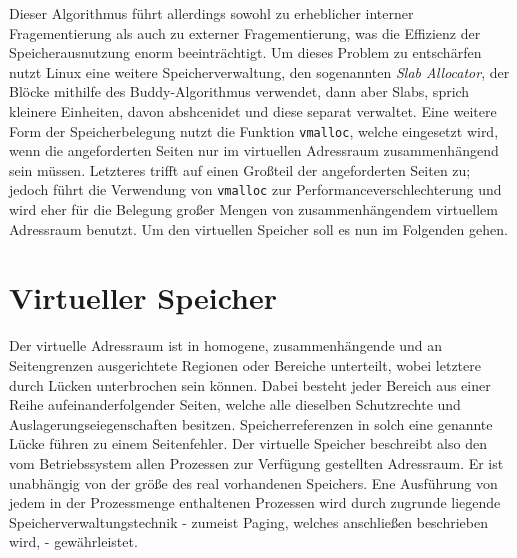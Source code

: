 \documentclass[11pt,a4paper]{article}
\begin{document}
\newline
Dieser Algorithmus führt allerdings sowohl zu erheblicher interner Fragementierung als auch zu externer Fragementierung, was die Effizienz der Speicherausnutzung enorm beeinträchtigt.
\newline
Um dieses Problem zu entschärfen nutzt Linux eine weitere Speicherverwaltung, den sogenannten \textit{Slab Allocator}, der Blöcke mithilfe des Buddy-Algorithmus verwendet, dann aber Slabs, sprich kleinere Einheiten, davon abshcenidet und diese separat verwaltet. 
\newline
Eine weitere Form der Speicherbelegung nutzt die Funktion \texttt{vmalloc}, welche eingesetzt wird, wenn die angeforderten Seiten nur im virtuellen Adressraum zusammenhängend sein müssen. Letzteres trifft auf einen Großteil der 
angeforderten Seiten zu; jedoch führt die Verwendung von \texttt{vmalloc} zur Performanceverschlechterung und wird eher für die Belegung großer Mengen von zusammenhängendem virtuellem Adressraum benutzt. Um den virtuellen Speicher soll es nun im Folgenden gehen.

\newpage 
\section*{Virtueller Speicher}
Der virtuelle Adressraum ist in homogene, zusammenhängende und an Seitengrenzen ausgerichtete Regionen oder Bereiche unterteilt, wobei letztere durch Lücken unterbrochen sein können. Dabei besteht jeder Bereich aus einer Reihe aufeinanderfolgender Seiten, welche alle dieselben Schutzrechte und Auslagerungseiegenschaften besitzen. Speicherreferenzen in solch eine genannte Lücke führen zu einem Seitenfehler. Der virtuelle Speicher beschreibt also den vom Betriebssystem allen Prozessen zur Verfügung gestellten Adressraum. Er ist unabhängig von der größe des real vorhandenen Speichers. Ene Ausführung von jedem in der Prozessmenge enthaltenen Prozessen wird durch zugrunde liegende Speicherverwaltungstechnik - zumeist Paging, welches anschließen beschrieben wird, - gewährleistet. 
\end{document}
